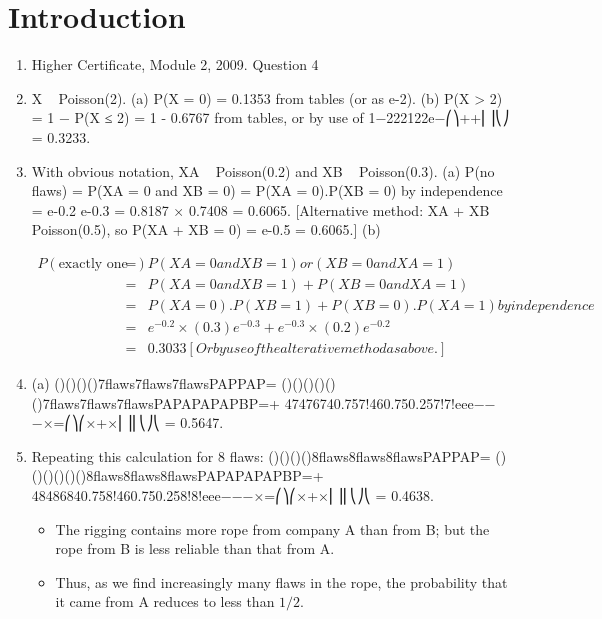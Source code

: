 \documentclass[a4paper,12pt]{article}
\begin{document}
\maketitle

\section{Introduction}

\begin{enumerate}
    \item Higher Certificate, Module 2, 2009. Question 4
    \item  X ~ Poisson(2).
(a) P(X = 0) = 0.1353 from tables (or as e-2).
(b) P(X > 2) = 1 − P(X ≤ 2) = 1 - 0.6767 from tables, or by use of
1−222122e−⎛⎞++⎜⎟⎝⎠
= 0.3233.

    \item  With obvious notation, XA ~ Poisson(0.2) and XB ~ Poisson(0.3).
(a) P(no flaws) = P(XA = 0 and XB = 0)
= P(XA = 0).P(XB = 0) by independence
= e-0.2 e-0.3 = 0.8187 × 0.7408 = 0.6065.
[Alternative method: XA + XB ~ Poisson(0.5), so P(XA + XB = 0) = e-0.5 = 0.6065.]
(b) 


\begin{eqnarray}
P(\mbox{exactly one flaw}) &=& P{(XA = 0 and XB = 1) or (XB = 0 and XA = 1)}\\
&=& P(XA = 0 and XB = 1) + P(XB = 0 and XA = 1)\\
&=& P(XA = 0).P(XB = 1) + P(XB = 0).P(XA = 1) by independence\\
&=& e^{-0.2} × (0.3)e^{-0.3}+ e^{-0.3} × (0.2)e^{-0.2}\\
&=& 0.3033 [Or by use of the alterative method as above.]
\end{eqnarray}
    \item  (a) ()()()()7flaws7flaws7flawsPAPPAP=
()()()()()()7flaws7flaws7flawsPAPAPAPAPBP=+
47476740.757!460.750.257!7!eee−−−×=⎛⎞⎛×+×⎜⎟⎜⎝⎠⎝ = 0.5647.
    \item  Repeating this calculation for 8 flaws:
()()()()8flaws8flaws8flawsPAPPAP=
()()()()()()8flaws8flaws8flawsPAPAPAPAPBP=+
48486840.758!460.750.258!8!eee−−−×=⎛⎞⎛×+×⎜⎟⎜⎝⎠⎝ = 0.4638.

\begin{itemize}
\item The rigging contains more rope from company A than from B; but the rope from B is less reliable than that from A. 
\item Thus, as we find increasingly many flaws in the rope, the probability that it came from A reduces to less than $1/2$.
\end{itemize}
\end{enumerate}
\end{document}
